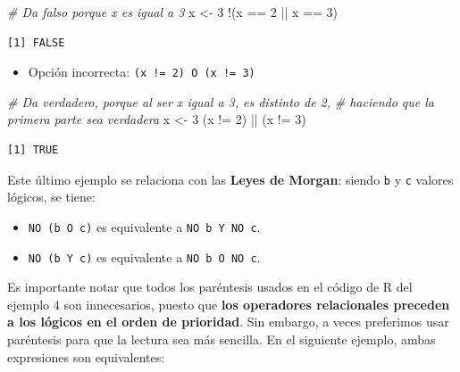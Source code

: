 \documentclass[
]{book}
\newenvironment{Shaded}{\begin{snugshade}}{\end{snugshade}}
\newcommand{\CommentTok}[1]{\textcolor[rgb]{0.56,0.35,0.01}{\textit{#1}}}
\newcommand{\DecValTok}[1]{\textcolor[rgb]{0.00,0.00,0.81}{#1}}
\newcommand{\NormalTok}[1]{#1}
\newcommand{\OtherTok}[1]{\textcolor[rgb]{0.56,0.35,0.01}{#1}}
\newcommand{\SpecialCharTok}[1]{\textcolor[rgb]{0.00,0.00,0.00}{#1}}
\providecommand{\tightlist}{%
  \setlength{\itemsep}{0pt}\setlength{\parskip}{0pt}}
\begin{document}
\begin{enumerate}
\begin{Shaded}
\begin{Highlighting}[]
\CommentTok{\# Da falso porque x es igual a 3}
\NormalTok{x }\OtherTok{\textless{}{-}} \DecValTok{3}
\SpecialCharTok{!}\NormalTok{(x }\SpecialCharTok{==} \DecValTok{2} \SpecialCharTok{||}\NormalTok{ x }\SpecialCharTok{==} \DecValTok{3}\NormalTok{)}
\end{Highlighting}
\end{Shaded}

\begin{verbatim}
[1] FALSE
\end{verbatim}

  \begin{itemize}
  \tightlist
  \item
    Opción incorrecta: \texttt{(x\ !=\ 2)\ O\ (x\ !=\ 3)}
  \end{itemize}

\begin{Shaded}
\begin{Highlighting}[]
\CommentTok{\# Da verdadero, porque al ser x igual a 3, es distinto de 2,}
\CommentTok{\# haciendo que la primera parte sea verdadera }
\NormalTok{x }\OtherTok{\textless{}{-}} \DecValTok{3}
\NormalTok{(x }\SpecialCharTok{!=} \DecValTok{2}\NormalTok{) }\SpecialCharTok{||}\NormalTok{ (x }\SpecialCharTok{!=} \DecValTok{3}\NormalTok{)}
\end{Highlighting}
\end{Shaded}

\begin{verbatim}
[1] TRUE
\end{verbatim}
\end{enumerate}

Este último ejemplo se relaciona con las \textbf{Leyes de Morgan}: siendo \texttt{b} y \texttt{c} valores lógicos, se tiene:

\begin{itemize}
\tightlist
\item
  \texttt{NO\ (b\ O\ c)} es equivalente a \texttt{NO\ b\ Y\ NO\ c}.
\item
  \texttt{NO\ (b\ Y\ c)} es equivalente a \texttt{NO\ b\ O\ NO\ c}.
\end{itemize}

Es importante notar que todos los paréntesis usados en el código de R del ejemplo 4 son innecesarios, puesto que \textbf{los operadores relacionales preceden a los lógicos en el orden de prioridad}. Sin embargo, a veces preferimos usar paréntesis para que la lectura sea más sencilla. En el siguiente ejemplo, ambas expresiones son equivalentes:
\end{document}
